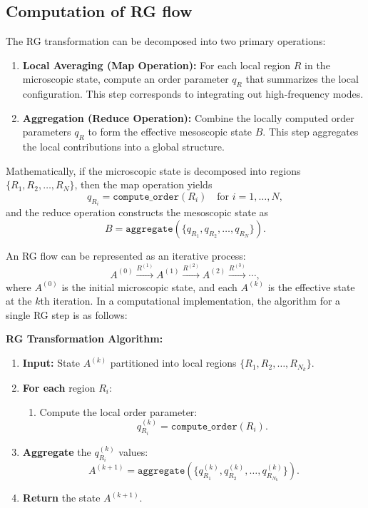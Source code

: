 \subsection{Computation of RG flow}

The RG transformation can be decomposed into two primary operations:
\begin{enumerate}[label=(\arabic*)]
	\item \textbf{Local Averaging (Map Operation):} For each local region \(R\) in the microscopic state, compute an order parameter \(q_R\) that summarizes the local configuration. This step corresponds to integrating out high-frequency modes.
	\item \textbf{Aggregation (Reduce Operation):} Combine the locally computed order parameters \(q_R\) to form the effective mesoscopic state \(B\). This step aggregates the local contributions into a global structure.
\end{enumerate}

Mathematically, if the microscopic state is decomposed into regions \( \{ R_1, R_2, \dots, R_N \} \), then the map operation yields
\[
q_{R_i} = \texttt{compute\_order}(R_i) \quad \text{for } i=1,\dots, N,
\]
and the reduce operation constructs the mesoscopic state as
\[
B = \texttt{aggregate}(\{q_{R_1}, q_{R_2}, \dots, q_{R_N}\}).
\]

An RG flow can be represented as an iterative process:
\[
A^{(0)} \xrightarrow{R^{(1)}} A^{(1)} \xrightarrow{R^{(2)}} A^{(2)} \xrightarrow{R^{(3)}} \cdots,
\]
where \(A^{(0)}\) is the initial microscopic state, and each \(A^{(k)}\) is the effective state at the \(k\)th iteration. In a computational implementation, the algorithm for a single RG step is as follows:

\begin{formal}
	\textbf{RG Transformation Algorithm:}
	\begin{enumerate}[label=(\arabic*)]
		\item \textbf{Input:} State \(A^{(k)}\) partitioned into local regions \(\{ R_1, R_2, \dots, R_{N_k} \}\).
		\item \textbf{For each} region \(R_i\):
		\begin{enumerate}[label=(\alph*)]
			\item Compute the local order parameter:
			\[
			q_{R_i}^{(k)} = \texttt{compute\_order}(R_i).
			\]
		\end{enumerate}
		\item \textbf{Aggregate} the \(q_{R_i}^{(k)}\) values:
		\[
		A^{(k+1)} = \texttt{aggregate}(\{q_{R_1}^{(k)}, q_{R_2}^{(k)}, \dots, q_{R_{N_k}}^{(k)}\}).
		\]
		\item \textbf{Return} the state \(A^{(k+1)}\).
	\end{enumerate}
\end{formal}

